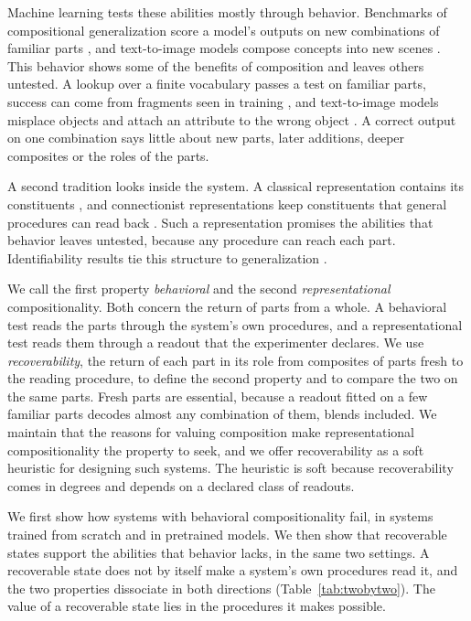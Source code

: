 Machine learning tests these abilities mostly through behavior. Benchmarks of compositional generalization score a model's outputs on new combinations of familiar parts \citep{lake2018,keysers2020,kim2020cogs,hupkes2020}, and text-to-image models compose concepts into new scenes \citep{ramesh2021,okawa2023}. This behavior shows some of the benefits of composition and leaves others untested. A lookup over a finite vocabulary passes a test on familiar parts, success can come from fragments seen in training \citep{dziri2023}, and text-to-image models misplace objects \citep{conwell2022} and attach an attribute to the wrong object \citep{rassin2022}. A correct output on one combination says little about new parts, later additions, deeper composites or the roles of the parts.

A second tradition looks inside the system. A classical representation contains its constituents \citep{fodor1988}, and connectionist representations keep constituents that general procedures can read back \citep{smolensky1990,vangelder1990}. Such a representation promises the abilities that behavior leaves untested, because any procedure can reach each part. Identifiability results tie this structure to generalization \citep{lachapelle2023,wiedemer2024,uselis2026}.

We call the first property \emph{behavioral} and the second \emph{representational} compositionality. Both concern the return of parts from a whole. A behavioral test reads the parts through the system's own procedures, and a representational test reads them through a readout that the experimenter declares. We use \emph{recoverability}, the return of each part in its role from composites of parts fresh to the reading procedure, to define the second property and to compare the two on the same parts. Fresh parts are essential, because a readout fitted on a few familiar parts decodes almost any combination of them, blends included. We maintain that the reasons for valuing composition make representational compositionality the property to seek, and we offer recoverability as a soft heuristic for designing such systems. The heuristic is soft because recoverability comes in degrees and depends on a declared class of readouts.

We first show how systems with behavioral compositionality fail, in systems trained from scratch and in pretrained models. We then show that recoverable states support the abilities that behavior lacks, in the same two settings. A recoverable state does not by itself make a system's own procedures read it, and the two properties dissociate in both directions (Table~\ref{tab:twobytwo}). The value of a recoverable state lies in the procedures it makes possible.

